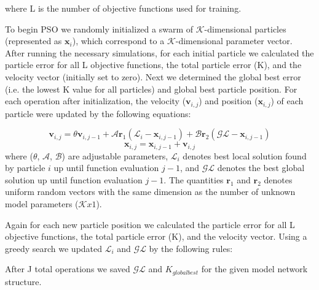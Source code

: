 \documentclass[12pt]{article}
\begin{document}
where L is the number of objective functions used for training. 

To begin PSO we randomly initialized a swarm of $\mathcal{K}$-dimensional particles (represented as $\mathbf{x}_{i}$), which correspond to a $\mathcal{K}$-dimensional parameter vector.
After running the necessary simulations, for each initial particle we calculated the particle error for all L objective functions, the total particle error (K), and the velocity vector (initially set to zero).  
Next we determined the global best error (i.e. the lowest K value for all particles) and global best particle position. 
For each operation after initialization, the velocity ($\mathbf{v}_{i,j}$) and position ($\mathbf{x}_{i,j}$) of each particle were updated by the following equations:

\begin{equation}
\mathbf{v}_{i,j} = \theta \mathbf{v}_{i,j-1} + \mathcal{A} \mathbf{r}_{1} (\mathcal{L}_{i} - \mathbf{x}_{i,j-1}) + \mathcal{B} \mathbf{r}_{2}(\mathcal{GL} - \mathbf{x}_{i,j-1})
\end{equation} 
\begin{equation}
\mathbf{x}_{i,j} = \mathbf{x}_{i,j-1} + \mathbf{v}_{i,j} 
\end{equation} 
where ($\theta$, $\mathcal{A}$, $\mathcal{B}$) are adjustable parameters, $\mathcal{L}_{i}$ denotes best local solution found by particle $i$ up until function evaluation $j-1$, and $\mathcal{GL}$ denotes the best global solution up until function evaluation $j-1$.
The quantities $\mathbf{r}_{1}$ and $\mathbf{r}_{2}$ denotes uniform random vectors with the same dimension as the number of unknown model parameters ($\mathcal{K}x1$). 

\clearpage

Again for each new particle position we calculated the particle error for all L objective functions, the total particle error (K), and the velocity vector. 
Using a greedy search we updated $\mathcal{L}_{i}$ and $\mathcal{GL}$ by the following rules: 
\begin{algorithm}
\end{algorithm}

After J total operations we saved $\mathcal{GL}$ and $K_{globalbest}$ for the given model network structure. 
\end{document}
